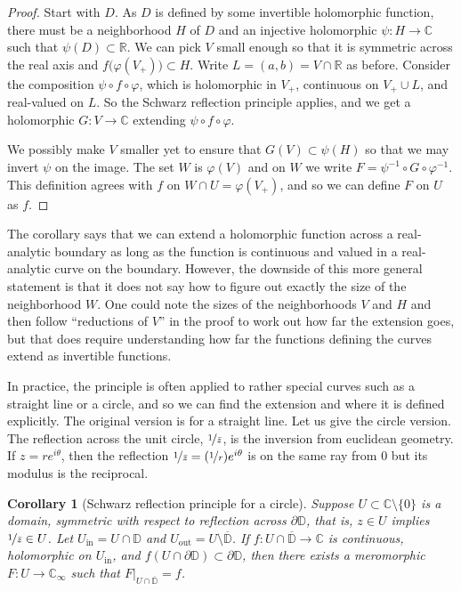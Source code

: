 \documentclass[12pt,openany]{book}
\newcommand{\C}{{\mathbb{C}}}
\newcommand{\R}{{\mathbb{R}}}
\newcommand{\D}{{\mathbb{D}}}
\newcommand{\myquote}[1]{``#1''}
\theoremstyle{plain}
\newtheorem{cor}[thm]{Corollary}
\theoremstyle{remark}
\theoremstyle{definition}
\theoremstyle{exercise}
\theoremstyle{example}
\begin{document}
\begin{proof}
Start with $D$.  As $D$ is defined by some invertible holomorphic
function,
there must be a neighborhood $H$ of $D$ and an injective
holomorphic $\psi \colon H \to \C$ such that $\psi(D) \subset \R$.
We can pick $V$ small enough so that it is symmetric across the real axis
and $f\bigl(\varphi(V_+)\bigr) \subset H$.
Write $L = (a,b) = V \cap \R$ as before.
Consider the composition $\psi \circ f \circ \varphi$, which is
holomorphic in $V_+$, continuous on $V_+ \cup L$, and
real-valued on $L$.  So the Schwarz reflection principle applies,
and we get a holomorphic $G \colon V \to \C$ extending
$\psi \circ f \circ \varphi$.

We possibly make $V$ smaller yet to ensure that $G(V) \subset \psi(H)$ so that
we may invert $\psi$ on the image.
The set $W$ is $\varphi(V)$ and on $W$
we write $F = \psi^{-1} \circ G \circ \varphi^{-1}$.  This definition
agrees with $f$ on $W \cap U = \varphi(V_+)$, and so we can define $F$ on $U$ as $f$.
\end{proof}

The corollary says that we can extend a holomorphic function across
a real-analytic boundary as long as the function is continuous and valued in
a real-analytic curve on the boundary.  However, the downside of this more
general statement is that it
does not say how to figure out exactly the size of the neighborhood $W$.
One could note the sizes of the neighborhoods $V$ and $H$
and then follow \myquote{reductions of $V$} in the proof to work out how far
the extension goes, but that does require understanding how far the
functions defining the curves extend as invertible functions.

In practice, the principle is often applied to rather special curves such as
a straight line or a circle, and so we can
find the extension and where it is defined explicitly.
The original version is for a
straight line.  Let us give the circle version.
The reflection across the unit circle, $\nicefrac{1}{\bar{z}}$, is the inversion from
euclidean geometry.
If $z = re^{i\theta}$, then the reflection
$\nicefrac{1}{\bar{z}} = (\nicefrac{1}{r}) e^{i\theta}$ is on the same ray from
$0$ but its modulus is the reciprocal.

\begin{cor}[Schwarz reflection principle for a circle]
\label{thm:schwarzreflectioncircleholo}
Suppose $U \subset \C \setminus \{ 0 \}$ is a domain,
symmetric with respect to reflection across $\partial \D$,
that is, $z \in U$ implies $\nicefrac{1}{\bar{z}} \in U$.
Let $U_{\text{in}} = U \cap \D$ and $U_{\text{out}} = U \setminus \overline{\D}$.
If $f \colon U \cap \overline{\D} \to \C$ is continuous,
holomorphic on $U_{\text{in}}$,
and $f(U \cap \partial \D) \subset \partial \D$,
then there exists a meromorphic $F \colon U \to \C_\infty$ such that
$F|_{U \cap \overline{\D}} = f$.
\end{cor}
\end{document}
